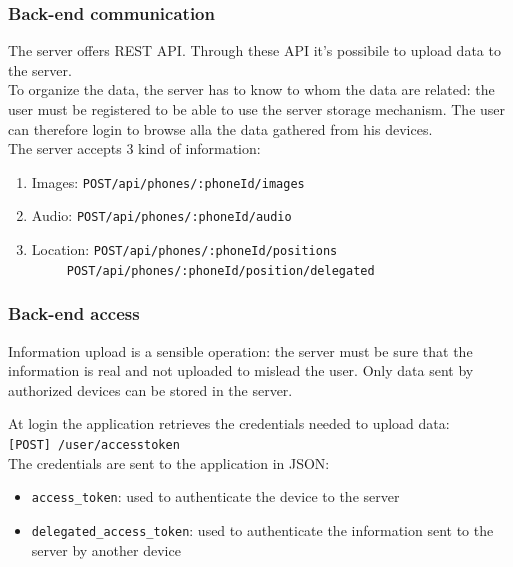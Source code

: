 \documentclass{beamer}
\begin{document}
\begin{frame}
\frametitle{Back-end communication}
The server offers REST API. Through these API it's possibile to upload data to the server.\\
To organize the data, the server has to know to whom the data are related: the user must be registered to be able to use the server storage mechanism. The user can therefore login to browse alla the data gathered from his devices.\\
The server accepts 3 kind of information:
\begin{enumerate}
  \item Images: \texttt{\lbrack POST\rbrack	/api/phones/:phoneId/images}
  \item Audio: \texttt{\lbrack POST\rbrack 	/api/phones/:phoneId/audio}
  \item Location: \texttt{\lbrack POST\rbrack  /api/phones/:phoneId/positions}\\
                  ~~~~~\texttt{\lbrack POST\rbrack  /api/phones/:phoneId/position/delegated}
\end{enumerate}
\end{frame}

\begin{frame}
\frametitle{Back-end access}
\begin{block}{}
Information upload is a sensible operation: the server must be sure that the information is real and not uploaded to mislead the user. Only data sent by authorized devices can be stored in the server.
\end{block}
At login the application retrieves the credentials needed to upload data:\\
\texttt{[POST] /user/accesstoken}\\
The credentials are sent to the application in JSON:
\begin{itemize}
  \item \texttt{access\_token}: used to authenticate the device to the server
  \item \texttt{delegated\_access\_token}: used to authenticate the information sent to the server by another device
\end{itemize}
\end{frame}
\end{document}
